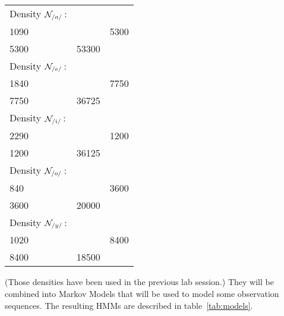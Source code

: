\documentclass[twoside,a4paper,titlepage]{article}
\newcommand{\PBS}[1]{\let\temp=\\#1\let\\=\temp}
\newcommand{\CC}{\PBS\centering\hspace{0pt}}
\begin{document}
\begin{tabular}{>{\CC}m{10em}>{\CC}m{12em}>{\CC}m{12em}}
Density ${\cal N}_{/a/}$\,: &
\[ \mu_{/a/} = \left[\begin{array}{r} 730 \\ 1090 \end{array}\right] \] &
\[ \Sigma_{/a/} = \left[\begin{array}{rr} 1625 & 5300 \\ 5300 & 53300 \end{array}\right] \] \\
Density ${\cal N}_{/e/}$\,: &
\[ \mu_{/e/} = \left[\begin{array}{r} 530 \\ 1840 \end{array}\right] \] &
\[ \Sigma_{/e/} = \left[\begin{array}{rr} 15025 & 7750 \\ 7750 & 36725 \end{array}\right] \] \\
Density ${\cal N}_{/i/}$\,: &
\[ \mu_{/i/} = \left[\begin{array}{r} 270 \\ 2290 \end{array}\right] \] &
\[ \Sigma_{/i/} = \left[\begin{array}{rr} 2525 & 1200 \\ 1200 & 36125 \end{array}\right] \] \\
Density ${\cal N}_{/o/}$\,: &
\[ \mu_{/o/} = \left[\begin{array}{r} 570 \\ 840 \end{array}\right] \] &
\[ \Sigma_{/o/} = \left[\begin{array}{rr} 2000 & 3600 \\ 3600 & 20000 \end{array}\right] \] \\
Density ${\cal N}_{/y/}$\,: &
\[ \mu_{/y/} = \left[\begin{array}{r} 440 \\ 1020 \end{array}\right] \] &
\[ \Sigma_{/y/} = \left[\begin{array}{rr} 8000 & 8400 \\ 8400 & 18500 \end{array}\right] \] \\
\end{tabular}

\noindent (Those densities have been used in the previous lab session.)
They will be combined into Markov Models that will be used to model some
observation sequences. The resulting HMMs are described in
table~\ref{tab:models}.
\end{document}
